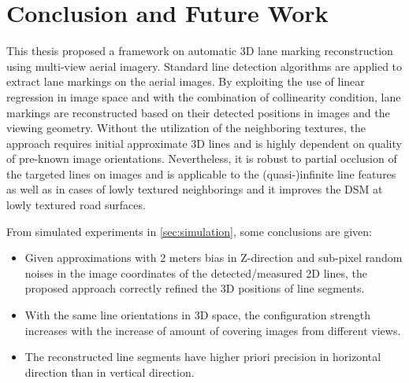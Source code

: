 
\chapter{Conclusion and Future Work}
\label{chap:conclusion}

This thesis proposed a framework on automatic 3D lane marking reconstruction using multi-view aerial imagery. Standard line detection algorithms are applied to extract lane markings on the aerial images. By exploiting the use of linear regression in image space and with the combination of collinearity condition, lane markings are reconstructed based on their detected positions in images and the viewing geometry. Without the utilization of the neighboring textures, the approach requires initial approximate 3D lines and is highly dependent on quality of pre-known image orientations. Nevertheless, it is robust to partial occlusion of the targeted lines on images and is applicable to the (quasi-)infinite line features as well as in cases of lowly textured neighborings and it improves the DSM at lowly textured road surfaces. 


From simulated experiments in \cref{sec:simulation}, some conclusions are given:
\begin{itemize}
	\item Given approximations with 2 meters bias in Z-direction and sub-pixel random noises in the image coordinates of the detected/measured 2D lines, the proposed approach correctly refined the 3D positions of line segments.
	
	\item With the same line orientations in 3D space, the configuration strength increases with the increase of amount of covering images from different views.
	
	\item The reconstructed line segments have higher priori precision in horizontal direction than in vertical direction.
\end{itemize}


